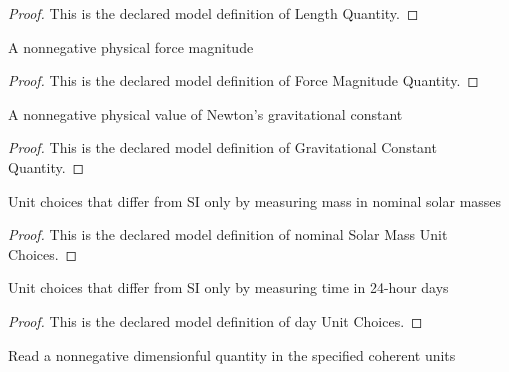 \begin{proof}
  This is the declared model definition of Length Quantity.
\end{proof}
\begin{definition}
  \label{def:physics:phyx-mini-0716:phyxminiproblems-problemphyxmini0716-forcemagnitudequantity}
  A nonnegative physical force magnitude
\end{definition}
\begin{proof}
  This is the declared model definition of Force Magnitude Quantity.
\end{proof}
\begin{definition}
  \label{def:physics:phyx-mini-0716:phyxminiproblems-problemphyxmini0716-gravitationalconstantquantity}
  A nonnegative physical value of Newton's gravitational constant
\end{definition}
\begin{proof}
  This is the declared model definition of Gravitational Constant Quantity.
\end{proof}
\begin{definition}
  \label{def:physics:phyx-mini-0716:phyxminiproblems-problemphyxmini0716-nominalsolarmassunitchoices}
  Unit choices that differ from SI only by measuring mass in nominal solar masses
\end{definition}
\begin{proof}
  This is the declared model definition of nominal Solar Mass Unit Choices.
\end{proof}
\begin{definition}
  \label{def:physics:phyx-mini-0716:phyxminiproblems-problemphyxmini0716-dayunitchoices}
  Unit choices that differ from SI only by measuring time in 24-hour days
\end{definition}
\begin{proof}
  This is the declared model definition of day Unit Choices.
\end{proof}
\begin{definition}
  \label{def:physics:phyx-mini-0716:phyxminiproblems-problemphyxmini0716-nonnegativereadout}
  Read a nonnegative dimensionful quantity in the specified coherent units
\end{definition}

